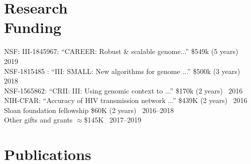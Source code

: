 \documentclass[margin,line,letterpaper]{resume}
\begin{document}
\begin{resume}
    
    
    \section{\mysidestyle Research\\Funding}
      NSF: III-1845967:  ``CAREER: Robust \& scalable genome...''
 \$549k (5 years)~
 \hfill 2019\\
      NSF-1815485 :  ``III: SMALL: New algorithms for genome ...''
 \$500k (3 years)~
 \hfill 2018\\
 NSF-1565862:  ``CRII: III: Using genomic context to ...''
 \$170k (2 years)~
 \hfill 2016\\
 NIH-CFAR:  ``Accuracy of HIV transmission network ...''
 \$439K (2 years)~
 \hfill 2016\\
 Sloan foundation fellowship \$60K (2 years) \hfill  ~2016--2018\\
 Other gifts and grants $\approx$\$145K  \hfill  ~2017--2019
\clearpage

    \renewcommand*{\thefootnote}{\fnsymbol{footnote}}
    \section{\mysidestyle Publications}

\newcommand\blfootnote[1]{%
  \begingroup
  \renewcommand\thefootnote{}\footnote{#1}%
  \addtocounter{footnote}{-1}%
  \endgroup
}
    
\def\FormatName#1{%
  \def\myname{Siavash Mirarab}
  \def\mynamee{Siavash Mirarab*}%
  \edef\name{#1}%
  \ifx\name\myname
    \textbf{#1}%
  \else
    \ifx\name\mynamee
       \textbf{Siavash Mirarab}\footnote[1]{Equal contributions}%
    \else
      #1%
    \fi
  \fi
}

\vspace{-2pt}
\begin{spacing}{1.2}

\end{spacing}

\vspace{-10pt}


\end{resume}
\end{document}
